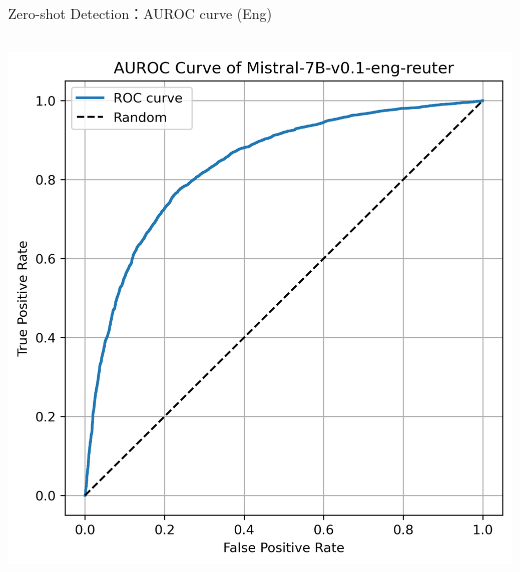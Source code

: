 \documentclass[serif]{beamer}
\begin{document}
\begin{frame}{Zero-shot Detection：AUROC curve (Eng)}
\begin{columns}[t]
    \centering
    \includegraphics[width=\linewidth]{images/Mistral-7B-v0.1-eng-reuter.png}


\end{columns}
\end{frame}
\end{document}
